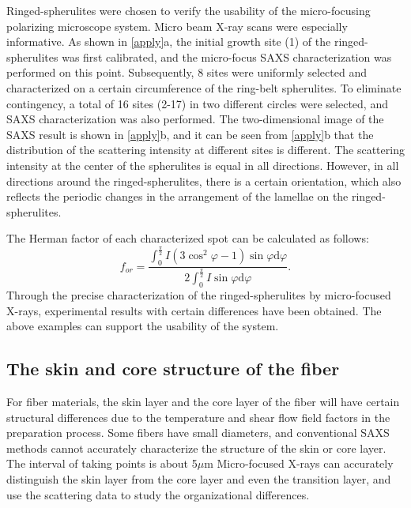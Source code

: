 \documentclass{Head}
\begin{document}
Ringed-spherulites were chosen to verify the usability of the micro-focusing polarizing microscope system.
Micro beam X-ray scans were especially informative. As shown in \autoref{apply}a, the initial growth site (1) of the ringed-spherulites was first calibrated, and the micro-focus SAXS characterization was performed on this point.
Subsequently, 8 sites were uniformly selected and characterized on a certain circumference of the ring-belt spherulites.
To eliminate contingency, a total of 16 sites (2-17) in two different circles were selected, and SAXS characterization was also performed.
The two-dimensional image of the SAXS result is shown in \autoref{apply}b, and it can be seen from \autoref{apply}b that the distribution of the scattering intensity at different sites is different. The scattering intensity at the center of the spherulites is equal in all directions.
However, in all directions around the ringed-spherulites, there is a certain orientation, which also reflects the periodic changes in the arrangement of the lamellae on the ringed-spherulites.


The Herman factor of each characterized spot can be calculated as follows:
\begin{equation}
    f_{or}=\frac{\int_0^{\frac{\pi}{2}}I(3\cos^2\varphi-1)\sin\varphi\mathrm{d}\varphi}{2\int_0^{\frac{\pi}{2}}I\sin\varphi\mathrm{d}\varphi}.
\end{equation}
Through the precise characterization of the ringed-spherulites by micro-focused X-rays, experimental results with certain differences have been obtained. The above examples can support the usability of the system.
\subsection{The skin and core structure of the fiber}
For fiber materials, the skin layer and the core layer of the fiber will have certain structural differences due to the temperature and shear flow field factors in the preparation process.
Some fibers have small diameters, and conventional SAXS methods cannot accurately characterize the structure of the skin or core layer.
The interval of taking points is about 5$\mu$m
Micro-focused X-rays can accurately distinguish the skin layer from the core layer and even the transition layer, and use the scattering data to study the organizational differences.
\end{document}

